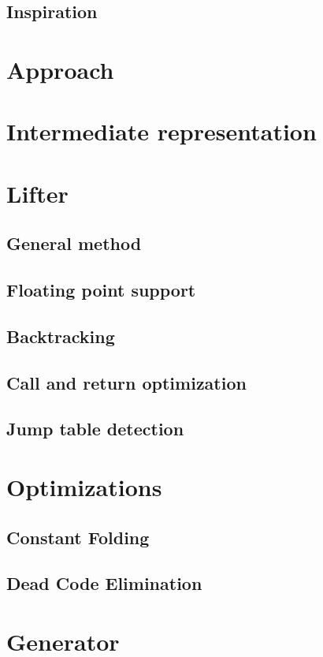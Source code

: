 \documentclass[course=eragp]{aspdoc}
\begin{document}
\subsection{Inspiration}

\section{Approach}

\section{Intermediate representation}

\section{Lifter}
\subsection{General method}
\subsection{Floating point support}
\subsection{Backtracking}
\subsection{Call and return optimization}
\subsection{Jump table detection}

\section{Optimizations}
\subsection{Constant Folding}
\subsection{Dead Code Elimination}

\clearpage

\section{Generator}
\end{document}
